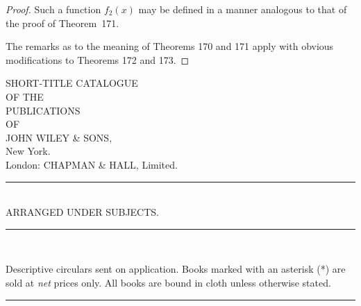 \documentclass[a4paper,12pt]{book}[2004/02/16]
\providecommand{\printindex}{}
\providecommand{\hyperlink}[2]{#2}
\theoremstyle{ilemma}
\theoremstyle{itheorem}
\theoremstyle{iother}
\theoremstyle{icorollary}
\theoremstyle{numcorollary}
\theoremstyle{idefinition}
\begin{document}
\begin{proof}
Such a function $f_2(x)$ may be defined in a manner analogous to that
of the proof of Theorem~\hyperlink{thm171}{171}.

The remarks as to the meaning of Theorems \hyperlink{thm170}{170} and \hyperlink{thm171}{171} apply with
obvious modifications to Theorems \hyperlink{thm172}{172} and \hyperlink{thm173}{173}.
\end{proof}

\backmatter
{\setlength{\columnsep}{1cm}
\printindex}
\pagestyle{plain}
\newpage\setcounter{page}{1}
{\centering
{\sffamily\Huge
SHORT-TITLE CATALOGUE\\[0.5ex]}
\small
OF THE\\[0.5ex]
\LARGE
PUBLICATIONS\\[0.5ex]
\small
OF\\
\Huge
JOHN WILEY \& SONS,\\[0.5ex]
\sffamily\sc\large
New York.\\[2ex]
\Large\sc
London: CHAPMAN \& HALL, Limited.\\[0.5ex]
\rule[0.5ex]{2cm}{.2pt}\\
\normalfont\normalsize
ARRANGED UNDER SUBJECTS.\\
\rule[0.5ex]{2cm}{.2pt}\\}


\footnotesize Descriptive circulars sent on application. Books marked
with an asterisk (*) are sold at \textit{net} prices only. All books
are bound in cloth unless otherwise stated.
\bigskip

\begin{center} \rule[0.5ex]{2cm}{.2pt} \end{center}
\bigskip
\end{document}
